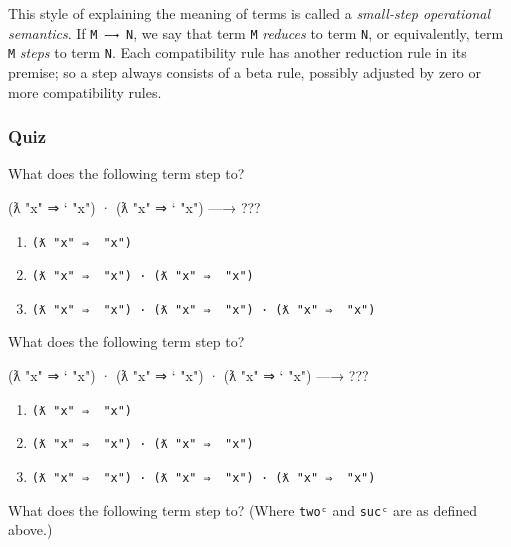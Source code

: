 This style of explaining the meaning of terms is called a
\emph{small-step operational semantics}. If \texttt{M\ —→\ N}, we say
that term \texttt{M} \emph{reduces} to term \texttt{N}, or equivalently,
term \texttt{M} \emph{steps} to term \texttt{N}. Each compatibility rule
has another reduction rule in its premise; so a step always consists of
a beta rule, possibly adjusted by zero or more compatibility rules.

\hypertarget{quiz-1}{%
\subsubsection{Quiz}\label{quiz-1}}

What does the following term step to?

\begin{myDisplay}
(ƛ "x" ⇒ ` "x") · (ƛ "x" ⇒ ` "x")  —→  ???
\end{myDisplay}

\begin{enumerate}
\def\labelenumi{\arabic{enumi}.}
\tightlist
\item
  \texttt{(ƛ\ "x"\ ⇒\ \textasciigrave{}\ "x")}
\item
  \texttt{(ƛ\ "x"\ ⇒\ \textasciigrave{}\ "x")\ ·\ (ƛ\ "x"\ ⇒\ \textasciigrave{}\ "x")}
\item
  \texttt{(ƛ\ "x"\ ⇒\ \textasciigrave{}\ "x")\ ·\ (ƛ\ "x"\ ⇒\ \textasciigrave{}\ "x")\ ·\ (ƛ\ "x"\ ⇒\ \textasciigrave{}\ "x")}
\end{enumerate}

What does the following term step to?

\begin{myDisplay}
(ƛ "x" ⇒ ` "x") · (ƛ "x" ⇒ ` "x") · (ƛ "x" ⇒ ` "x")  —→  ???
\end{myDisplay}

\begin{enumerate}
\def\labelenumi{\arabic{enumi}.}
\tightlist
\item
  \texttt{(ƛ\ "x"\ ⇒\ \textasciigrave{}\ "x")}
\item
  \texttt{(ƛ\ "x"\ ⇒\ \textasciigrave{}\ "x")\ ·\ (ƛ\ "x"\ ⇒\ \textasciigrave{}\ "x")}
\item
  \texttt{(ƛ\ "x"\ ⇒\ \textasciigrave{}\ "x")\ ·\ (ƛ\ "x"\ ⇒\ \textasciigrave{}\ "x")\ ·\ (ƛ\ "x"\ ⇒\ \textasciigrave{}\ "x")}
\end{enumerate}

What does the following term step to? (Where \texttt{twoᶜ} and
\texttt{sucᶜ} are as defined above.)

